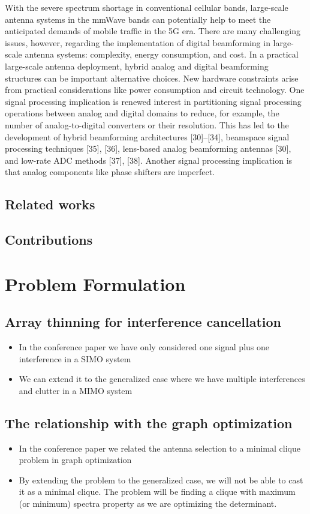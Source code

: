 \documentclass[journal]{IEEEtran}
\begin{document}
With the severe spectrum shortage in conventional cellular bands, large-scale antenna systems in the mmWave bands can potentially help to meet the anticipated demands of mobile traffic in the 5G era. There are many challenging issues, however, regarding the implementation of digital beamforming in large-scale antenna systems: complexity, energy consumption, and cost. In a practical large-scale antenna deployment, hybrid analog and digital beamforming structures can be important alternative choices. 
New hardware constraints arise from practical considerations
like power consumption and circuit technology. One signal processing implication is renewed interest in partitioning signal processing operations between analog and digital domains to reduce, for example, the number of analog-to-digital converters or their resolution. This has led to the development of hybrid beamforming architectures [30]–[34], beamspace signal processing techniques [35], [36], lens-based analog beamforming antennas [30], and low-rate ADC methods [37], [38]. Another signal processing implication is that analog components like phase shifters are imperfect.
\subsection{Related works}
\subsection{Contributions}
\section{Problem Formulation}\label{sec:framework}


\subsection{Array thinning for interference cancellation} 
\begin{itemize}
    \item In the conference paper we have only considered one signal plus one interference in a SIMO system   
\item We can extend it to the generalized case where we have multiple interferences and clutter in  a MIMO system
\end{itemize}
\subsection{The relationship with the graph optimization} 
\begin{itemize}
    \item In the conference paper we related the antenna selection to a minimal clique problem in graph optimization
\item By extending the problem to the generalized case, we will not be able to cast it as a minimal clique. The problem will be finding a clique with maximum (or minimum) spectra property as we are optimizing the determinant. 
\end{itemize}
\end{document}
